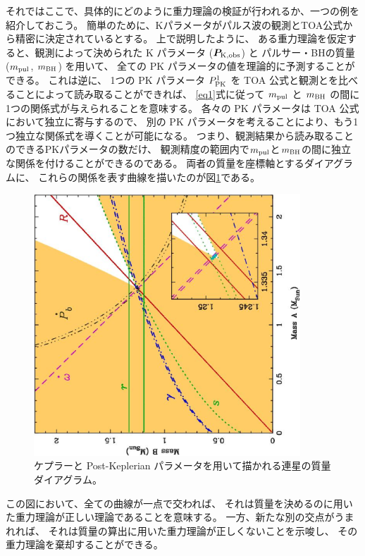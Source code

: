 それではここで、具体的にどのように重力理論の検証が行われるか、一つの例を紹介しておこう。
簡単のために、Kパラメータがパルス波の観測とTOA公式から精密に決定されているとする。
上で説明したように、
ある重力理論を仮定すると、観測によって決められた K パラメータ (${\bm P}_{\rm K,obs}$) と
パルサー・BHの質量 ($m_{\rm pul}$, $m_{\rm BH}$) を用いて、
全ての PK パラメータの値を理論的に予測することができる。
これは逆に、
1つの PK パラメータ $P^1_{\rm PK}$ を TOA 公式と観測とを比べることによって読み取ることができれば、
\eqref{eq1}式に従って $m_{\rm pul}$ と $m_{\rm BH}$ の間に1つの関係式が与えられることを意味する。
各々の PK パラメータは TOA 公式において独立に寄与するので、
別の PK パラメータを考えることにより、もう1つ独立な関係式を導くことが可能になる。
%
つまり、観測結果から読み取ることのできるPKパラメータの数だけ、
観測精度の範囲内で$m_{\rm pul}$と$m_{\rm BH}$の間に独立な関係を付けることができるのである。
両者の質量を座標軸とするダイアグラムに、
これらの関係を表す曲線を描いたのが図\ref{fig_mass}である。
\begin{figure}[t]
\begin{center}
\includegraphics[width=100mm,angle=270]{pulsar/fig_Kramer.ps}
\end{center}
\caption{
ケプラーと Post-Keplerian パラメータを用いて描かれる連星の質量ダイアグラム\citep{Kramer:2006nb}。
}
\label{fig_mass}
\end{figure}
この図において、全ての曲線が一点で交われば、
それは質量を決めるのに用いた重力理論が正しい理論であることを意味する。
一方、新たな別の交点がうまれれば、
それは質量の算出に用いた重力理論が正しくないことを示唆し、
その重力理論を棄却することができる。

